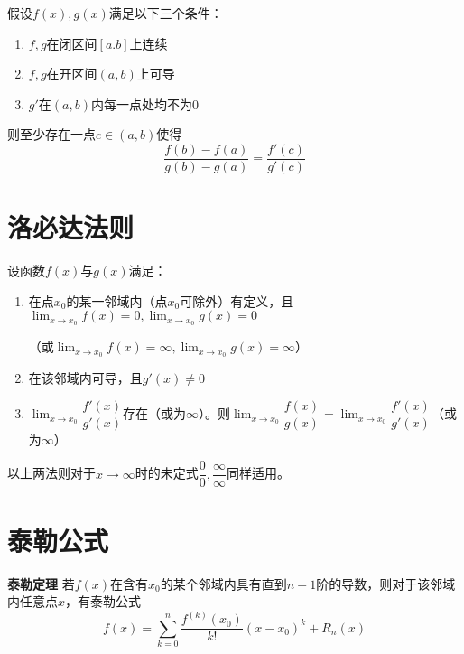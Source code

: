 \begin{theorem}[柯西中值定理] \label{thm:Cauchy_mean_value_theorem}
    假设$f(x),g(x)$满足以下三个条件：
    \begin{enumerate}
        \item $f,g$在闭区间$[a.b]$上连续
        \item $f,g$在开区间$(a,b)$上可导
        \item $g'$在$(a,b)$内每一点处均不为0
    \end{enumerate}

    则至少存在一点$c\in(a,b)$使得
    \begin{equation}
        \dfrac{f(b)-f(a)}{g(b)-g(a)} = \dfrac{f'(c)}{g'(c)}
        \nonumber
    \end{equation}
\end{theorem}

\section{洛必达法则}
设函数$f(x)$与$g(x)$满足：
\begin{enumerate}
    \item 在点$x_0$的某一邻域内（点$x_0$可除外）有定义，且$\displaystyle \lim_{x\rightarrow x_0}f(x)=0, \lim_{x\rightarrow x_0}g(x)=0$
    
    （或$\displaystyle \lim_{x\rightarrow x_0}f(x)=\infty, \lim_{x\rightarrow x_0}g(x)=\infty$）

    \item 在该邻域内可导，且$g'(x)\neq 0$

    \item $\displaystyle \lim_{x\rightarrow x_0} \dfrac{f'(x)}{g'(x)}$存在（或为$\infty$）。则$\displaystyle \lim_{x\rightarrow x_0}\dfrac{f(x)}{g(x)}=\lim_{x\rightarrow x_0}\dfrac{f'(x)}{g'(x)}$（或为$\infty$）
\end{enumerate}

以上两法则对于$x\rightarrow\infty$时的未定式$\dfrac{0}{0},\dfrac{\infty}{\infty}$同样适用。

\section{泰勒公式}
\textbf{泰勒定理} \quad 若$f(x)$在含有$x_0$的某个邻域内具有直到$n+1$阶的导数，则对于该邻域内任意点$x$，有泰勒公式
\begin{equation}
    f(x)=\sum_{k=0}^n \dfrac{f^{(k)}(x_0)}{k!}(x-x_0)^k+ R_n(x)
    \nonumber
\end{equation}

